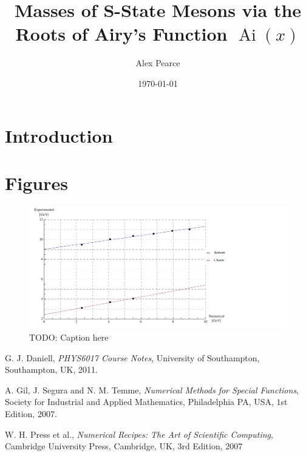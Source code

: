 \documentclass[]{article}
\newcommand{\Ai}[1]{\ensuremath{\operatorname{Ai}({#1})}}
\begin{document}
\title{Masses of S-State Mesons via the Roots of Airy's Function $\Ai{x}$}
\author{Alex Pearce}
\date{\today}
\maketitle


\begin{abstract}
\end{abstract}

\section{Introduction}\label{sec:intro}


\section{Figures}\label{sec:figures}

\begin{figure}[H]
	\hspace*{-0.15\textwidth}
	\centering
	\includegraphics[scale=1.3]{experimental-numerical}
	\caption{TODO: Caption here}
	\label{fig:data}
\end{figure}


\begin{thebibliography}{9}
  G. J. Daniell,
  \emph{PHYS6017 Course Notes},
  University of Southampton, Southampton, UK,
  2011.
  
  A. Gil, J. Segura and N. M. Temme,
  \emph{Numerical Methods for Special Functions},
  Society for Industrial and Applied Mathematics, Philadelphia PA, USA,
  $1$st Edition,
  2007.
  
  W. H. Press et al.,
  \emph{Numerical Recipes: The Art of Scientific Computing},
  Cambridge University Press, Cambridge, UK,
  $3$rd Edition,
  2007
  
\end{thebibliography}
\end{document}
